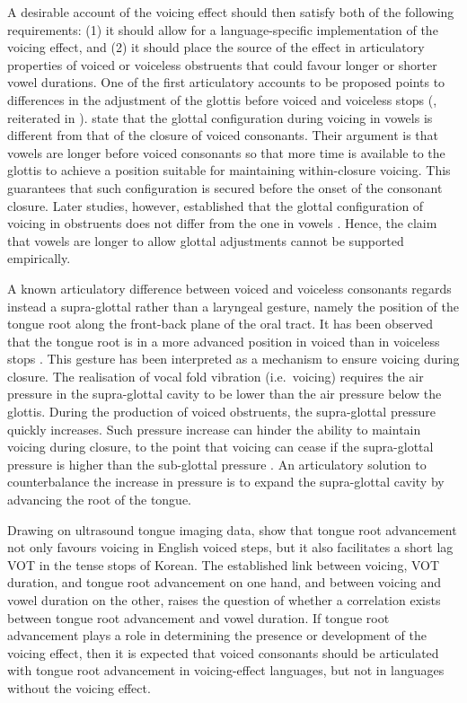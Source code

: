 \documentclass[authoryear, twocolumn]{elsarticle}
\begin{document}
A desirable account of the voicing effect should then satisfy both of
the following requirements: (1) it should allow for a language-specific
implementation of the voicing effect, and (2) it should place the source
of the effect in articulatory properties of voiced or voiceless
obstruents that could favour longer or shorter vowel durations. One of
the first articulatory accounts to be proposed points to differences in
the adjustment of the glottis before voiced and voiceless stops
(\citealt{halle1967}, reiterated in \citealt{chomsky1968}).
\citet{halle1967} state that the glottal configuration during voicing in
vowels is different from that of the closure of voiced consonants. Their
argument is that vowels are longer before voiced consonants so that more
time is available to the glottis to achieve a position suitable for
maintaining within-closure voicing. This guarantees that such
configuration is secured before the onset of the consonant closure.
Later studies, however, established that the glottal configuration of
voicing in obstruents does not differ from the one in vowels
\citep{lisker1974,kagaya1975}. Hence, the claim that vowels are longer
to allow glottal adjustments cannot be supported empirically.

A known articulatory difference between voiced and voiceless consonants
regards instead a supra-glottal rather than a laryngeal gesture, namely
the position of the tongue root along the front-back plane of the oral
tract. It has been observed that the tongue root is in a more advanced
position in voiced than in voiceless stops
\citep{kent1969,perkell1969,westbury1983}. This gesture has been
interpreted as a mechanism to ensure voicing during closure. The
realisation of vocal fold vibration (i.e.~voicing) requires the air
pressure in the supra-glottal cavity to be lower than the air pressure
below the glottis. During the production of voiced obstruents, the
supra-glottal pressure quickly increases. Such pressure increase can
hinder the ability to maintain voicing during closure, to the point that
voicing can cease if the supra-glottal pressure is higher than the
sub-glottal pressure \citep{ohala2011}. An articulatory solution to
counterbalance the increase in pressure is to expand the supra-glottal
cavity by advancing the root of the tongue.

Drawing on ultrasound tongue imaging data, \citet{ahn2016} show that
tongue root advancement not only favours voicing in English voiced
steps, but it also facilitates a short lag VOT in the tense stops of
Korean. The established link between voicing, VOT duration, and tongue
root advancement on one hand, and between voicing and vowel duration on
the other, raises the question of whether a correlation exists between
tongue root advancement and vowel duration. If tongue root advancement
plays a role in determining the presence or development of the voicing
effect, then it is expected that voiced consonants should be articulated
with tongue root advancement in voicing-effect languages, but not in
languages without the voicing effect.
\end{document}
